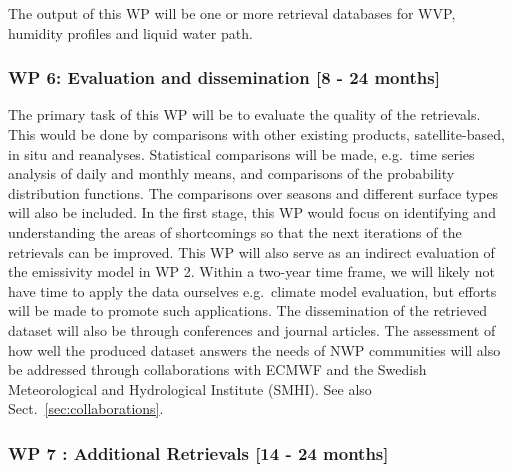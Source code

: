 \documentclass[12pt,oneside,a4paper]{article}
\begin{document}
The output of this WP will be one or more retrieval databases for WVP, humidity
profiles and liquid water path.
\vspace{-1.0ex}

\subsubsection*{WP 6: Evaluation and dissemination [8 - 24 months]}
%
\label{sec:evaluation}
The primary task of this WP will be to evaluate the quality of the retrievals.
This would be done by comparisons with other existing products,
satellite-based, in situ and reanalyses. Statistical comparisons will be made,
e.g.\ time series analysis of daily and monthly means, and comparisons of the
probability distribution functions. The comparisons over seasons and different
surface types will also be included. In the first stage, this WP would focus on
identifying and understanding the areas of shortcomings so that the next
iterations of the retrievals can be improved. This WP will also serve as an
indirect evaluation of the emissivity model in WP 2. Within a two-year time
frame, we will likely not have time to apply the data ourselves e.g.\
climate model evaluation, but efforts will be made to promote such applications.
The dissemination of the retrieved dataset will also be through conferences and
journal articles. The assessment of how well the produced dataset answers the
needs of NWP communities will also be addressed through collaborations with
ECMWF and the Swedish Meteorological and Hydrological Institute (SMHI). See
also Sect.~\ref{sec:collaborations}.
\vspace{-1.0ex}
\subsubsection*{WP 7 : Additional Retrievals [14 - 24 months]}
%
\label{sec:other_retrievals}
\end{document}

